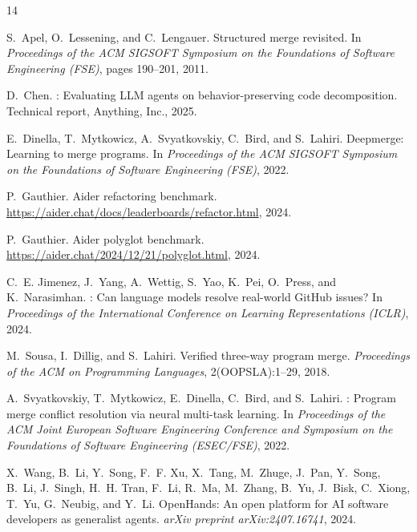 \documentclass[11pt,letterpaper]{article}
\begin{document}
\begin{thebibliography}{14}

S.~Apel, O.~Lessening, and C.~Lengauer.
\newblock Structured merge revisited.
\newblock In \emph{Proceedings of the ACM SIGSOFT Symposium on the Foundations of Software Engineering (FSE)}, pages 190--201, 2011.

D.~Chen.
: Evaluating {LLM} agents on behavior-preserving code decomposition.
\newblock Technical report, Anything, Inc., 2025.

E.~Dinella, T.~Mytkowicz, A.~Svyatkovskiy, C.~Bird, and S.~Lahiri.
\newblock Deepmerge: Learning to merge programs.
\newblock In \emph{Proceedings of the ACM SIGSOFT Symposium on the Foundations of Software Engineering (FSE)}, 2022.

P.~Gauthier.
\newblock Aider refactoring benchmark.
\newblock \url{https://aider.chat/docs/leaderboards/refactor.html}, 2024.

P.~Gauthier.
\newblock Aider polyglot benchmark.
\newblock \url{https://aider.chat/2024/12/21/polyglot.html}, 2024.

C.~E. Jimenez, J.~Yang, A.~Wettig, S.~Yao, K.~Pei, O.~Press, and K.~Narasimhan.
: Can language models resolve real-world {GitHub} issues?
\newblock In \emph{Proceedings of the International Conference on Learning Representations (ICLR)}, 2024.

M.~Sousa, I.~Dillig, and S.~Lahiri.
\newblock Verified three-way program merge.
\newblock \emph{Proceedings of the ACM on Programming Languages}, 2(OOPSLA):1--29, 2018.

A.~Svyatkovskiy, T.~Mytkowicz, E.~Dinella, C.~Bird, and S.~Lahiri.
: Program merge conflict resolution via neural multi-task learning.
\newblock In \emph{Proceedings of the ACM Joint European Software Engineering Conference and Symposium on the Foundations of Software Engineering (ESEC/FSE)}, 2022.

X.~Wang, B.~Li, Y.~Song, F.~F. Xu, X.~Tang, M.~Zhuge, J.~Pan, Y.~Song, B.~Li, J.~Singh, H.~H. Tran, F.~Li, R.~Ma, M.~Zhang, B.~Yu, J.~Bisk, C.~Xiong, T.~Yu, G.~Neubig, and Y.~Li.
\newblock Open{H}ands: An open platform for {AI} software developers as generalist agents.
\newblock \emph{arXiv preprint arXiv:2407.16741}, 2024.


\end{thebibliography}
\end{document}

